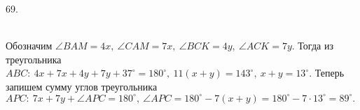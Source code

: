 69. \begin{figure}[ht!]
\end{figure}\\
Обозначим $\angle BAM=4x,\ \angle CAM=7x,\ \angle BCK=4y,\ \angle ACK=7y.$ Тогда из треугольника $ABC:\ 4x+7x+4y+7y+37^\circ=180^\circ,\ 11(x+y)=143^\circ,\ x+y=13^\circ.$ Теперь запишем сумму углов треугольника $APC:\ 7x+7y+\angle APC=180^\circ,\ \angle APC=180^\circ-7(x+y)=180^\circ-7\cdot13^\circ=89^\circ.$\\
